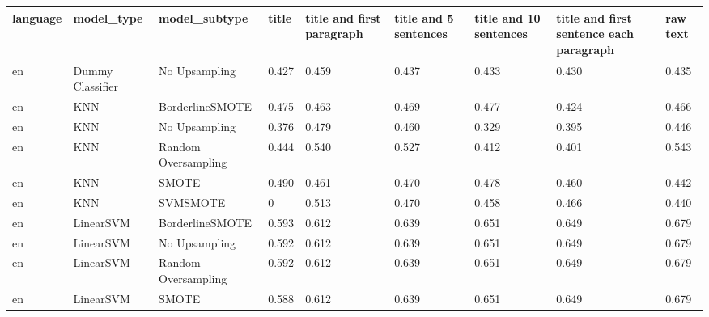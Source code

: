 \begin{tabular}{lllllllll}
\toprule
language &                   model\_type &       model\_subtype & title & title and first paragraph & title and 5 sentences & title and 10 sentences & title and first sentence each paragraph &  raw text \\
\midrule
      en &             Dummy Classifier &       No Upsampling & 0.427 &                     0.459 &                 0.437 &                  0.433 &                                   0.430 &     0.435 \\
      en &                          KNN &     BorderlineSMOTE & 0.475 &                     0.463 &                 0.469 &                  0.477 &                                   0.424 &     0.466 \\
      en &                          KNN &       No Upsampling & 0.376 &                     0.479 &                 0.460 &                  0.329 &                                   0.395 &     0.446 \\
      en &                          KNN & Random Oversampling & 0.444 &                     0.540 &                 0.527 &                  0.412 &                                   0.401 &     0.543 \\
      en &                          KNN &               SMOTE & 0.490 &                     0.461 &                 0.470 &                  0.478 &                                   0.460 &     0.442 \\
      en &                          KNN &            SVMSMOTE &     0 &                     0.513 &                 0.470 &                  0.458 &                                   0.466 &     0.440 \\
      en &                    LinearSVM &     BorderlineSMOTE & 0.593 &                     0.612 &                 0.639 &                  0.651 &                                   0.649 &     0.679 \\
      en &                    LinearSVM &       No Upsampling & 0.592 &                     0.612 &                 0.639 &                  0.651 &                                   0.649 &     0.679 \\
      en &                    LinearSVM & Random Oversampling & 0.592 &                     0.612 &                 0.639 &                  0.651 &                                   0.649 &     0.679 \\
      en &                    LinearSVM &               SMOTE & 0.588 &                     0.612 &                 0.639 &                  0.651 &                                   0.649 &     0.679 \\

\end{tabular}
